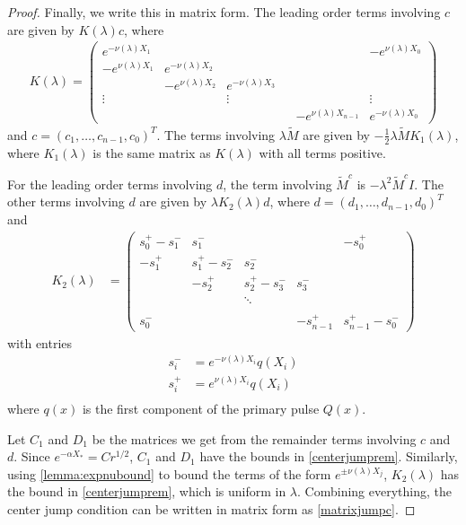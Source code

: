 \documentclass[thesis.tex]{subfiles}
\begin{document}
\begin{lemma}
\begin{proof}
Finally, we write this in matrix form. The leading order terms involving $c$ are given by $K(\lambda)c$, where
\begin{align*}
K(\lambda) =  
\begin{pmatrix}
e^{-\nu(\lambda)X_1} & & & & & -e^{\nu(\lambda)X_0} \\
-e^{\nu(\lambda)X_1} & e^{-\nu(\lambda)X_2} \\
& -e^{\nu(\lambda)X_2} & e^{-\nu(\lambda)X_3} \\
\vdots & & \vdots & &&  \vdots \\
& & & & -e^{\nu(\lambda)X_{n-1}} & e^{-\nu(\lambda)X_0}
\end{pmatrix}
\end{align*}
and $c = (c_1, \dots, c_{n-1}, c_0)^T$. The terms involving $\lambda \tilde{M}$ are given by $-\frac{1}{2} \lambda \tilde{M} K_1(\lambda)$, where $K_1(\lambda)$ is the same matrix as $K(\lambda)$ with all terms positive.

For the leading order terms involving $d$, the term involving $\tilde{M}^c$ is $-\lambda^2 \tilde{M}^c I$. The other terms involving $d$ are given by $\lambda K_2(\lambda) d$, where $d = (d_1, \dots, d_{n-1}, d_0)^T$ and 
\begin{align*}
K_2(\lambda) &= \begin{pmatrix}
s_0^+ - s_1^- & s_1^- &&& -s_0^+ \\
-s_1^+ & s_1^+ - s_2^- & s_2^- \\
& -s_2^+ & s_2^+ - s_3^- & s_3^- \\ && \ddots \\
\\
s_0^- &&& -s_{n-1}^+ & s_{n-1}^+ - s_0^- 
\end{pmatrix}
\end{align*}
with entries
\begin{align*}
s_i^- &= e^{-\nu(\lambda)X_i} q(X_i)\\
s_i^+ &= e^{\nu(\lambda)X_i} q(X_i)\\
\end{align*}
where $q(x)$ is the first component of the primary pulse $Q(x)$.

Let $C_1$ and $D_1$ be the matrices we get from the remainder terms involving $c$ and $d$. Since $e^{-\alpha X_*} = C r^{1/2}$, $C_1$ and $D_1$ have the bounds in \cref{centerjumprem}. Similarly, using \cref{lemma:expnubound} to bound the terms of the form $e^{\pm \nu(\lambda)X_j}$, $K_2(\lambda)$ has the bound in \cref{centerjumprem}, which is uniform in $\lambda$. Combining everything, the center jump condition can be written in matrix form as \cref{matrixjumpc}.
\end{proof}
\end{lemma}
\end{document}

